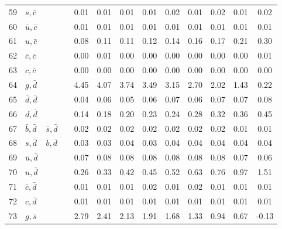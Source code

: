 \begin{tabularx}{\textwidth}{rXXX@{}S@{}S@{}S@{}S@{}S@{}S@{}S@{}S@{}S}
 59 & $s, \bar c$      &                   &                  &  0.01 &  0.01 &  0.01 &  0.01 &  0.02 &  0.01 &  0.02 &  0.01 &  0.02 \\
 60 & $\bar u, \bar c$ &                   &                  &  0.01 &  0.01 &  0.01 &  0.01 &  0.01 &  0.01 &  0.01 &  0.01 &  0.01 \\
 61 & $u, \bar c$      &                   &                  &  0.08 &  0.11 &  0.11 &  0.12 &  0.14 &  0.16 &  0.17 &  0.21 &  0.30 \\
 62 & $\bar c, \bar c$ &                   &                  &  0.00 &  0.01 &  0.00 &  0.00 &  0.00 &  0.00 &  0.00 &  0.00 &  0.01 \\
 63 & $c, \bar c$      &                   &                  &  0.00 &  0.00 &  0.00 &  0.00 &  0.00 &  0.00 &  0.00 &  0.00 &  0.00 \\
 64 & $g, \bar d$      &                   &                  &  4.45 &  4.07 &  3.74 &  3.49 &  3.15 &  2.70 &  2.02 &  1.43 &  0.22 \\
 65 & $\bar d, \bar d$ &                   &                  &  0.04 &  0.06 &  0.05 &  0.06 &  0.07 &  0.06 &  0.07 &  0.07 &  0.08 \\
 66 & $d, \bar d$      &                   &                  &  0.14 &  0.18 &  0.20 &  0.23 &  0.24 &  0.28 &  0.32 &  0.36 &  0.45 \\
 67 & $\bar b, \bar d$ & $\bar s, \bar d$  &                  &  0.02 &  0.02 &  0.02 &  0.02 &  0.02 &  0.02 &  0.02 &  0.01 &  0.01 \\
 68 & $s, \bar d$      & $b, \bar d$       &                  &  0.03 &  0.03 &  0.04 &  0.03 &  0.04 &  0.04 &  0.04 &  0.04 &  0.04 \\
 69 & $\bar u, \bar d$ &                   &                  &  0.07 &  0.08 &  0.08 &  0.08 &  0.08 &  0.08 &  0.08 &  0.07 &  0.06 \\
 70 & $u, \bar d$      &                   &                  &  0.26 &  0.33 &  0.42 &  0.45 &  0.52 &  0.63 &  0.76 &  0.97 &  1.51 \\
 71 & $\bar c, \bar d$ &                   &                  &  0.01 &  0.01 &  0.01 &  0.02 &  0.01 &  0.02 &  0.01 &  0.01 &  0.01 \\
 72 & $c, \bar d$      &                   &                  &  0.01 &  0.01 &  0.01 &  0.01 &  0.01 &  0.01 &  0.01 &  0.01 &  0.01 \\
 73 & $g, \bar s$      &                   &                  &  2.79 &  2.41 &  2.13 &  1.91 &  1.68 &  1.33 &  0.94 &  0.67 & -0.13 \\

\end{tabularx}
